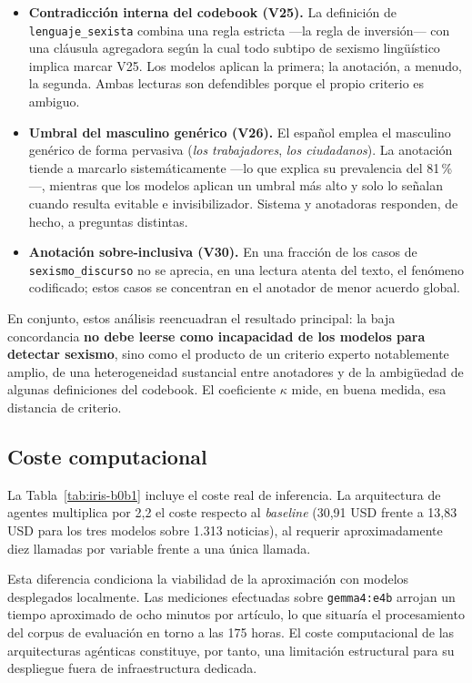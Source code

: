 \begin{itemize}
    \item \textbf{Contradicción interna del codebook (V25).} La definición de
    \texttt{lenguaje\_sexista} combina una regla estricta —la regla de inversión—
    con una cláusula agregadora según la cual todo subtipo de sexismo lingüístico
    implica marcar V25. Los modelos aplican la primera; la anotación, a menudo,
    la segunda. Ambas lecturas son defendibles porque el propio criterio es
    ambiguo.

    \item \textbf{Umbral del masculino genérico (V26).} El español emplea el
    masculino genérico de forma pervasiva (\textit{los trabajadores}, \textit{los
    ciudadanos}). La anotación tiende a marcarlo sistemáticamente —lo que explica
    su prevalencia del 81\,\%—, mientras que los modelos aplican un umbral más
    alto y solo lo señalan cuando resulta evitable e invisibilizador. Sistema y
    anotadoras responden, de hecho, a preguntas distintas.

    \item \textbf{Anotación sobre-inclusiva (V30).} En una fracción de los casos
    de \texttt{sexismo\_discurso} no se aprecia, en una lectura atenta del texto,
    el fenómeno codificado; estos casos se concentran en el anotador de menor
    acuerdo global.
\end{itemize}

En conjunto, estos análisis reencuadran el resultado principal: la baja
concordancia \textbf{no debe leerse como incapacidad de los modelos para detectar
sexismo}, sino como el producto de un criterio experto notablemente amplio, de
una heterogeneidad sustancial entre anotadores y de la ambigüedad de algunas
definiciones del codebook. El coeficiente $\kappa$ mide, en buena medida, esa
distancia de criterio.

\subsection{Coste computacional}
\label{subsec:iris_coste}

La Tabla~\ref{tab:iris-b0b1} incluye el coste real de inferencia. La
arquitectura de agentes multiplica por 2,2 el coste respecto al \textit{baseline}
(30,91 USD frente a 13,83 USD para los tres modelos sobre 1.313 noticias), al
requerir aproximadamente diez llamadas por variable frente a una única llamada.

Esta diferencia condiciona la viabilidad de la aproximación con modelos
desplegados localmente. Las mediciones efectuadas sobre \texttt{gemma4:e4b}
arrojan un tiempo aproximado de ocho minutos por artículo, lo que situaría el
procesamiento del corpus de evaluación en torno a las 175 horas. El coste
computacional de las arquitecturas agénticas constituye, por tanto, una
limitación estructural para su despliegue fuera de infraestructura dedicada.
